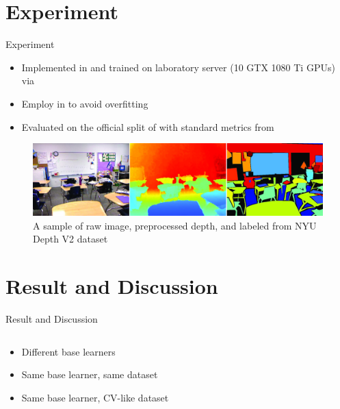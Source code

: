 \documentclass{cubeamer}
\begin{document}
\section{Experiment}
\begin{frame}{Experiment}
    \begin{itemize}
        \item Implemented in  \cite{pytorch} and trained on laboratory server (10 GTX 1080 Ti GPUs) via 
        \item Employ  in \cite{adabins} to avoid overfitting
        \item Evaluated on the official split of  \cite{nyu} with standard metrics from \cite{eigen2014} 
    \end{itemize}
    \begin{figure}
        \centering
        \includegraphics{figures/nyu_sample.jpg}
        \vspace{0.05cm}
        \caption{A sample of raw image, preprocessed depth, and labeled from NYU Depth V2 dataset \cite{nyu}}
    \end{figure}
\end{frame}

\section{Result and Discussion}
\begin{frame}{Result and Discussion}
    \begin{columns}
        \begin{column}{0.35\textwidth}
            \begin{itemize}
                \item Different base learners
                \item Same base learner, same dataset
                \item Same base learner, CV-like dataset
            \end{itemize}
        \end{column}
        \begin{column}{0.65\textwidth}
            
        \end{column}
    \end{columns}
\end{frame}
\end{document}
